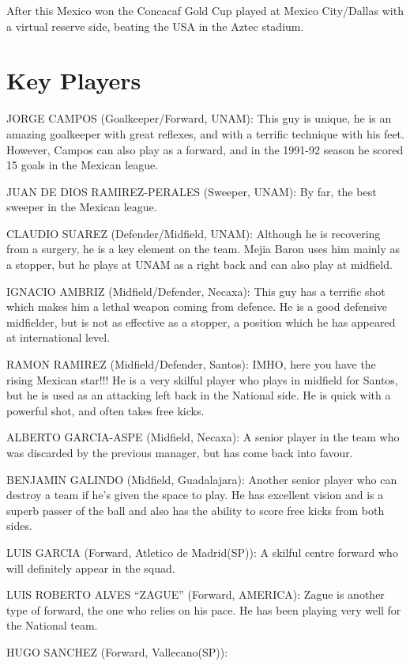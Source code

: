 After this Mexico won the Concacaf Gold Cup played at Mexico City/Dallas with 
a virtual reserve side, beating the USA in the Aztec stadium.
\section{Key Players}
JORGE CAMPOS (Goalkeeper/Forward, UNAM):
This guy is unique, he is an amazing goalkeeper with great reflexes, and with
a terrific technique with his feet. However, Campos can also play as a forward,
and in the 1991-92 season he scored 15 goals in the Mexican league.

JUAN DE DIOS RAMIREZ-PERALES (Sweeper, UNAM):
By far, the best sweeper in the Mexican league.

CLAUDIO SUAREZ (Defender/Midfield, UNAM):
Although he is recovering from a surgery, he is a key element on the team.
Mejia Baron uses him mainly as a stopper, but he plays at UNAM as a right back
and can also play at midfield.

IGNACIO AMBRIZ (Midfield/Defender, Necaxa):
This guy has a terrific shot which makes him a lethal weapon coming from 
defence. He is a good defensive midfielder, but is not as effective as a
stopper, a position which he has appeared at international level.

RAMON RAMIREZ (Midfield/Defender, Santos):
IMHO, here you have the rising Mexican star!!! He is a very skilful player who 
plays in midfield for Santos, but he is used as an attacking left back in the 
National side. He is quick with a powerful shot, and often takes free kicks.

ALBERTO GARCIA-ASPE (Midfield, Necaxa):
A senior player in the team who was discarded by the previous manager, but has
come back into favour.

BENJAMIN GALINDO (Midfield, Guadalajara):
Another senior player who can destroy a team if he's given the space to play. 
He has excellent vision and is a superb passer of the ball and also has the
ability to score free kicks from both sides.

LUIS GARCIA (Forward, Atletico de Madrid(SP)):
A skilful centre forward who will definitely appear in the squad.

LUIS ROBERTO ALVES ``ZAGUE'' (Forward, AMERICA):
Zague is another type of forward, the one who relies on his pace. He has been 
playing very well for the National team.

HUGO SANCHEZ (Forward, Vallecano(SP)):
